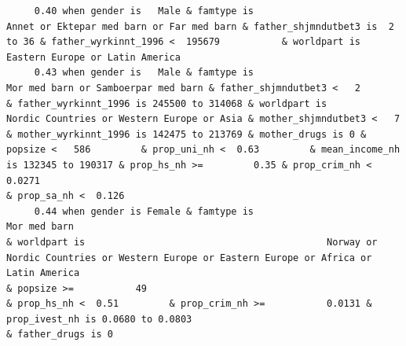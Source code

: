 \documentclass[
  letterpaper,
  DIV=11,
  numbers=noendperiod]{scrreprt}
\begin{document}
\begin{verbatim}
     0.40 when gender is   Male & famtype is                        Annet or Ektepar med barn or Far med barn & father_shjmndutbet3 is  2 to 36 & father_wyrkinnt_1996 <  195679           & worldpart is                                                                                                     Eastern Europe or Latin America                                                                                                                                                                                                                                                                                                                                                                                                                                                                                                                                          
     0.43 when gender is   Male & famtype is                              Mor med barn or Samboerpar med barn & father_shjmndutbet3 <   2       & father_wyrkinnt_1996 is 245500 to 314068 & worldpart is                                                                                          Nordic Countries or Western Europe or Asia & mother_shjmndutbet3 <   7       & mother_wyrkinnt_1996 is 142475 to 213769 & mother_drugs is 0 & popsize <   586         & prop_uni_nh <  0.63         & mean_income_nh is 132345 to 190317 & prop_hs_nh >=         0.35 & prop_crim_nh <  0.0271                                                                                                                  & prop_sa_nh <  0.126                                                                                                                                               
     0.44 when gender is Female & famtype is                                                     Mor med barn                                                                              & worldpart is                                           Norway or Nordic Countries or Western Europe or Eastern Europe or Africa or Latin America                                                                                                  & popsize >=           49                                                                    & prop_hs_nh <  0.51         & prop_crim_nh >=           0.0131 & prop_ivest_nh is 0.0680 to 0.0803                                                                                                                          & father_drugs is 0                                                                                           

\end{verbatim}
\end{document}
